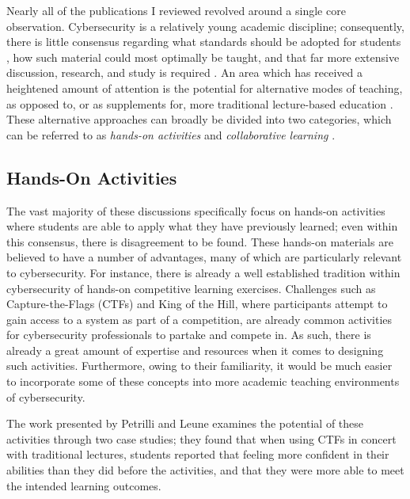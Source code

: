 \documentclass{article}
\begin{document}
    Nearly all of the publications I reviewed revolved around a single core observation. 
    Cybersecurity is a relatively young academic discipline; 
    consequently, there is little consensus regarding what standards should be adopted for students \cite{R-Raj}, how such material could most optimally be taught, and that far more extensive discussion, research, and study is required \cite{Z-Zeng}. 
    An area which has received a heightened amount of attention is the potential for alternative modes of teaching, as opposed to, or as supplements for, more traditional lecture-based education \cite{Z-Zeng,N-Eliot,E-Gavas,C-Herr,K-Chung, C-Kussmaul,K-Leune,B-Payne,L-Thomas}. 
    These alternative approaches can broadly be divided into two categories, which can be referred to as \emph{hands-on activities} and \emph{collaborative learning} \cite{P-Deshpande,C-Kussmaul,B-Payne}.

\subsection{Hands-On Activities}

    The vast majority of these discussions specifically focus on hands-on activities where students are able to apply what they have previously learned; even within this consensus, there is disagreement to be found. 
    These hands-on materials are believed to have a number of advantages, many of which are particularly relevant to cybersecurity. For instance, there is already a well established tradition within cybersecurity of hands-on competitive learning exercises. 
    Challenges such as Capture-the-Flags (CTFs) and King of the Hill, where participants attempt to gain access to a system as part of a competition, are already common activities for cybersecurity professionals to partake and compete in. 
    As such, there is already a great amount of expertise and resources when it comes to designing such activities. 
    Furthermore, owing to their familiarity, it would be much easier to incorporate some of these concepts into more academic teaching environments of cybersecurity.

    The work presented by Petrilli and Leune examines the potential of these activities through two case studies; 
    they found that when using CTFs in concert with traditional lectures, students reported that feeling more confident in their abilities than they did before the activities, and that they were more able to meet the intended learning outcomes. 
\end{document}
